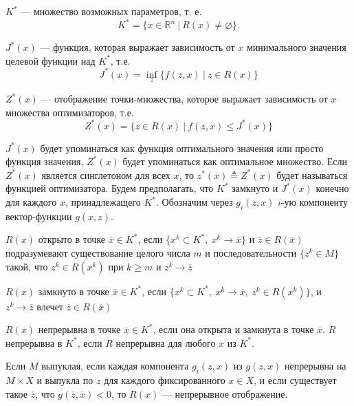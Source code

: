 $K^*$ --- множество возможных параметров, т. е.
\begin{equation} \label{3function}
    K^* = \{x \in \mathbb{R}^n \ |\  R(x) \not= \varnothing \}.
\end{equation}

$J^*(x)$ --- функция, которая выражает зависимость от $x$ минимального значения целевой функции над $K^*$, т.е.
\begin{equation} \label{4function}
    J^*(x) = \inf_{z}\{f(z,x) \ | \ z \in R(x) \}
\end{equation}

$Z^*(x)$ --- отображение точки-множества, которое выражает зависимость от $x$ множества оптимизаторов, т.е.
\begin{equation} \label{5function}
    Z^*(x) = \{ z \in R(x) \ | \ f(z,x) \leq J^*(x) \}
\end{equation}


$J^*(x)$ будет упоминаться как функция оптимального значения или просто функция значения, $Z^*(x)$ будет упоминаться как оптимальное множество. Если $Z^*(x)$ является синглетоном для всех $x$, то $z^*(x) \triangleq Z^*(x)$ будет называться функцией оптимизатора. Будем предполагать, что $K^*$ замкнуто и $J^*(x)$ конечно для каждого $x$, принадлежащего $K^*$. Обозначим через $g_{i}(z, x)$ $i$-ую компоненту вектор-функции $g(x, z)$.

\begin{definition}
    $R(x)$ открыто в точке $\overline{x} \in K^*$, если $\{ x^{k} \subset K^*,\ x^{k} \to \overline{x} \}$ и $\overline{z} \in R(\overline{x})$
    подразумевают существование целого числа $m$ и последовательности $\{ z^{k} \in M \}$ такой, что $z^{k} \in R(x^{k})$ при $k \geq m$ и $z^{k} \to \overline{z}$
\end{definition}


\begin{definition}
    $R(x)$ замкнуто в точке $\overline{x} \in K^*$, если $\{ x^{k}\subset K^*,\ x^{k} \to \overline{x},\ z^{k} \in R(x^{k}) \}$, и $z^{k} \to \overline{z}$ влечет  $\overline{z} \in R(\overline{x})$
\end{definition}


\begin{definition}
    $R(x)$ непрерывна в точке $\overline{x} \in K^*$, если она открыта и замкнута в точке $\overline{x}$. $R$ непрерывна в $K^*$, если $R$ непрерывна для любого $x$ из $K^*$.
\end{definition}

\begin{theorem}\label{1theorem}
    Если $M$ выпуклая, если каждая компонента $g_{i} (z, x)$ из $g (z, x)$ непрерывна на $M \times X$ и выпукла по $z$ для каждого фиксированного $x \in X$, и если существует такое $\overline{z}$, что $g(\overline{z}, \overline{x}) < 0$, то $R (x)$ --- непрерывное отображение.
\end{theorem}

